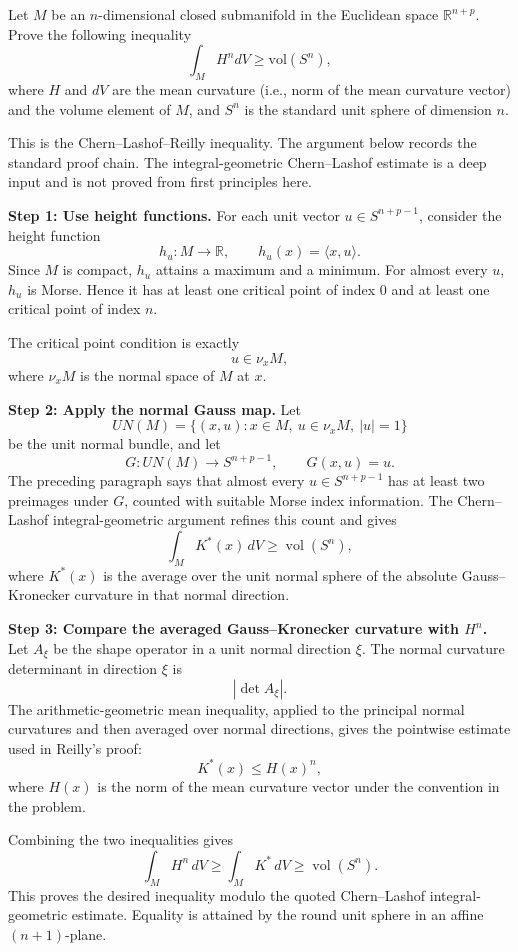 \begin{exercise}
\label{geometry:2018:5}
Let $M$ be an $n$-dimensional closed submanifold in the Euclidean space $\mathbb{R}^{n+p}$. Prove the following inequality
\[
\int_{M} H^n dV \geq \mathrm{vol}(S^n),
\]
where $H$ and $dV$ are the mean curvature (i.e., norm of the mean curvature vector) and the volume element of $M$, and $S^n$ is the standard unit sphere of dimension $n$.
\end{exercise}

\begin{solution}
This is the Chern--Lashof--Reilly inequality. The argument below records the standard proof chain. The integral-geometric Chern--Lashof estimate is a deep input and is not proved from first principles here.

\textbf{Step 1: Use height functions.}
For each unit vector $u\in S^{n+p-1}$, consider the height function
\[
h_u:M\to \mathbb{R},\qquad h_u(x)=\langle x,u\rangle.
\]
Since $M$ is compact, $h_u$ attains a maximum and a minimum. For almost every $u$, $h_u$ is Morse. Hence it has at least one critical point of index $0$ and at least one critical point of index $n$.

The critical point condition is exactly
\[
u\in \nu_xM,
\]
where $\nu_xM$ is the normal space of $M$ at $x$.

\textbf{Step 2: Apply the normal Gauss map.}
Let
\[
UN(M)=\{(x,u):x\in M,\ u\in \nu_xM,\ |u|=1\}
\]
be the unit normal bundle, and let
\[
G:UN(M)\to S^{n+p-1},\qquad G(x,u)=u.
\]
The preceding paragraph says that almost every $u\in S^{n+p-1}$ has at least two preimages under $G$, counted with suitable Morse index information. The Chern--Lashof integral-geometric argument refines this count and gives
\[
\int_M K^*(x)\,dV\geq \operatorname{vol}(S^n),
\]
where $K^*(x)$ is the average over the unit normal sphere of the absolute Gauss--Kronecker curvature in that normal direction.

\textbf{Step 3: Compare the averaged Gauss--Kronecker curvature with $H^n$.}
Let $A_\xi$ be the shape operator in a unit normal direction $\xi$. The normal curvature determinant in direction $\xi$ is
\[
|\det A_\xi|.
\]
The arithmetic-geometric mean inequality, applied to the principal normal curvatures and then averaged over normal directions, gives the pointwise estimate used in Reilly's proof:
\[
K^*(x)\leq H(x)^n,
\]
where $H(x)$ is the norm of the mean curvature vector under the convention in the problem.

Combining the two inequalities gives
\[
\int_M H^n\,dV
\geq
\int_M K^*\,dV
\geq
\operatorname{vol}(S^n).
\]
This proves the desired inequality modulo the quoted Chern--Lashof integral-geometric estimate. Equality is attained by the round unit sphere in an affine $(n+1)$-plane.
\end{solution}

